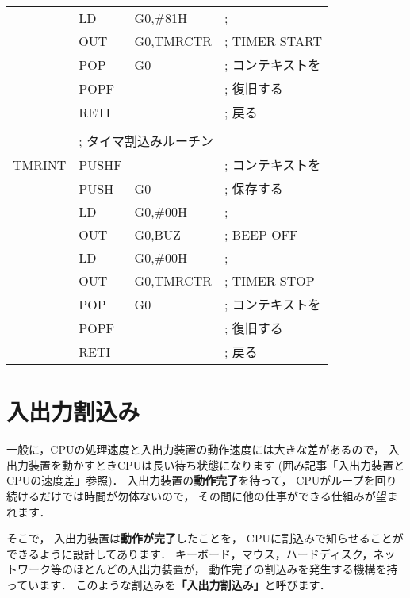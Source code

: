 \begin{center}
{\begin{tabular}{|l|l l l|}
       & LD     & G0,\#81H          & ;  \\
       & OUT    & G0,TMRCTR         & ; TIMER START  \\
       & POP    & G0                & ; コンテキストを  \\
       & POPF   &                   & ; 復旧する  \\
       & RETI   &                   & ; 戻る  \\
       &        &                   &   \\
       & \multicolumn{3}{|l|}{; タイマ割込みルーチン}       \\
TMRINT & PUSHF  &                   & ; コンテキストを  \\
       & PUSH   & G0                & ; 保存する  \\
       & LD     & G0,\#00H          & ;   \\
       & OUT    & G0,BUZ            & ; BEEP OFF  \\
       & LD     & G0,\#00H          & ;  \\
       & OUT    & G0,TMRCTR         & ; TIMER STOP  \\
       & POP    & G0                & ; コンテキストを  \\
       & POPF   &                   & ; 復旧する  \\
       & RETI   &                   & ; 戻る  \\
\hline
\end{tabular}
}
\end{center}

\newpage
\section{入出力割込み}

一般に，CPUの処理速度と入出力装置の動作速度には大きな差があるので，
入出力装置を動かすときCPUは長い待ち状態になります
(囲み記事「入出力装置とCPUの速度差」参照)．
入出力装置の{\bf 動作完了}を待って，
CPUがループを回り続けるだけでは時間が勿体ないので，
その間に他の仕事ができる仕組みが望まれます．

そこで，
入出力装置は{\bf 動作が完了}したことを，
CPUに割込みで知らせることができるように設計してあります．
キーボード，マウス，ハードディスク，ネットワーク等のほとんどの入出力装置が，
動作完了の割込みを発生する機構を持っています．
このような割込みを{\bf 「入出力割込み」}と呼びます．


